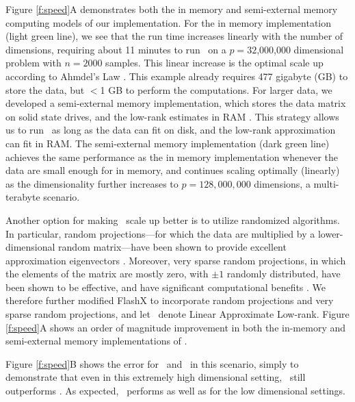 \documentclass[10pt]{article}
\begin{document}
Figure \ref{f:speed}A demonstrates both the in memory and semi-external memory \cite{SEM_SpMM} computing models of our implementation.  For the in memory implementation (light green line), we see that the run time increases linearly with the number of dimensions, requiring about 11 minutes to run \Lol~on a $p=32$,$000$,$000$ dimensional problem with $n=2000$ samples.   This linear increase is the optimal scale up according to Ahmdel's Law \cite{Amdahl1967}.  This example already requires 477 gigabyte (GB) to store the data, but $<$1 GB to perform the computations.  For larger data, we developed a semi-external memory implementation, which stores the data matrix on solid state drives, and the low-rank estimates in RAM \cite{abello1998functional}.  This strategy allows us to run \Lol~as long as the data can fit on disk, and the low-rank approximation can fit in RAM.  The semi-external memory implementation (dark green line) achieves the same performance as the in memory implementation whenever the data are small enough for in memory, and continues scaling optimally (linearly) as the dimensionality further increases to $p=128,000,000$ dimensions, a multi-terabyte scenario.   

Another option for making \Lol~scale up better is to utilize randomized algorithms.  In particular, random projections---for which the data are multiplied by a lower-dimensional random matrix---have been shown to provide excellent approximation eigenvectors \cite{Candes2006b}.  Moreover, very sparse random projections, in which the elements of the matrix are mostly zero, with $\pm 1$ randomly distributed, have been shown to be effective, and have significant computational benefits \cite{Hastie2006}. We therefore further modified FlashX to incorporate random projections and very sparse random projections, and let \Lal~denote Linear Approximate Low-rank.  Figure \ref{f:speed}A shows an order of magnitude improvement in both the in-memory and semi-external memory implementations of \Lal.


Figure \ref{f:speed}B shows the error for \Lol~and \PoF~in this scenario, simply to demonstrate that even in this extremely high dimensional setting, \Lol~still outperforms \PoF. As expected, \Lal~performs as well as \Lol for the low dimensional settings.

\end{document}
